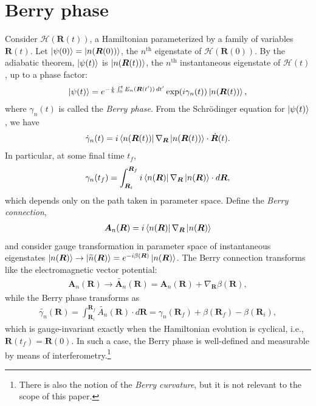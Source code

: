 \documentclass[reprint,
nofootinbib,
amsmath,amssymb,
aps]{revtex4-1}
\newcommand{\f}[2]{\frac{#1}{#2}}
\begin{document}
\section{Berry phase}\label{sect:berry}
Consider $\mathcal{H}(\bm{R}(t))$, a Hamiltonian parameterized by a family of variables $\bm{R}(t)$. Let $\ket{\psi(0)} = \ket{n(\bm{R}(0))}$, the $n^\text{th}$ eigenstate of $\mathcal{H}(\bm{R}(0))$. By the adiabatic theorem, $\ket{\psi(t)}$ is $\ket{n(\bm{R}(t))}$, the $n^\text{th}$ instantaneous eigenstate of $\mathcal{H}(t)$, up to a phase factor:
\begin{align*}
\ket{\psi(t)} = e^{ -\f{i}{\hbar }\int_0^t E_n(\bm{R} (t'))\,dt' } \exp(i\gamma_n(t)) \ket{n(\bm{R}(t))},
\end{align*}
where $\gamma_n(t)$ is called the \textit{Berry phase}. From the Schr\"{o}dinger equation for $\ket{\psi(t)}$, we have
\begin{align*}
\dot{\gamma}_n(t) = i \bra{n(\bm{R}(t))} \nabla_{\bm{R}}  \ket{n(\bm{R}(t)) } \cdot \dot{\bm{R}}(t).
\end{align*}
In particular, at some final time $t_f$,
\begin{align}\label{eq:def}
\gamma_n(t_f) =   \int^{\bm{R}_f}_{\bm{R}_i} i \bra{n(\bm{R})} \nabla_{\bm{R}}  \ket{n(\bm{R}) } \cdot d{\bm{R}},
\end{align} 
which depends only on the path taken in parameter space. Define the \textit{Berry connection}, 
\begin{align*}
\bm{A}_n(\bm{R}) = i \bra{n(\bm{R})} \nabla_{\bm{R}}  \ket{n(\bm{R}) }
\end{align*} 
and consider gauge transformation in parameter space of instantaneous eigenstates $\ket{n(\bm{R})} \to \ket{\widetilde{n}(\bm{R})} = e^{-i\beta(\bm{R})}\ket{n(\bm{R})}$. The Berry connection transforms like the electromagnetic  vector potential:
\begin{align*}
\bm{A}_n(\bm{R}) \to  \widetilde{\bm{A}_n}(\bm{R}) = \bm{A}_n(\bm{R}) + \nabla_{\bm{R}} \beta (\bm{R}),
\end{align*}
while the Berry phase transforms as
\begin{align*}
\widetilde{\gamma_n} (\bm{R}) = \int_{\bm{R}_i}^{\bm{R}_f} \widetilde{A_n}(\bm{R})\cdot d\bm{R} = \gamma_n(\bm{R}_f)  + \beta(\bm{R}_f) - \beta({\bm{R}_i}),
\end{align*}
which is gauge-invariant exactly when the Hamiltonian evolution is cyclical, i.e., $\bm{R}(t_f) = \bm{R}(0)$. In such a case, the Berry phase is well-defined and measurable by means of interferometry.\footnote{There is also the notion of the \textit{Berry curvature}, but it is not relevant to the scope of this paper.}
\end{document}
